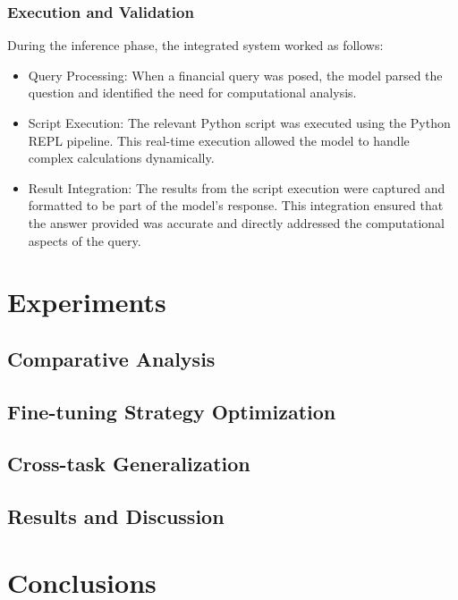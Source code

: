 \documentclass[logo,msc]{infthesis}           %
\begin{document}
\subsection{Execution and Validation}
During the inference phase, the integrated system worked as follows:

\begin{itemize}
    \item Query Processing: When a financial query was posed, the model parsed the question and identified the need for computational analysis.
    \item Script Execution: The relevant Python script was executed using the Python REPL pipeline. This real-time execution allowed the model to handle complex calculations dynamically.
    \item Result Integration: The results from the script execution were captured and formatted to be part of the model’s response. This integration ensured that the answer provided was accurate and directly addressed the computational aspects of the query.
\end{itemize}

\chapter{Experiments}

\section{Comparative Analysis}

\section{Fine-tuning Strategy Optimization}

\section{Cross-task Generalization}

\section{Results and Discussion}

\chapter{Conclusions}
\end{document}
